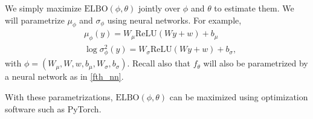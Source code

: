 \documentclass{scrartcl}
\begin{document}
We simply maximize $\text{ELBO}(\phi, \theta)$ jointly over $\phi$ and
$\theta$ to estimate them. We will parametrize $\mu_{\phi}$ and
$\sigma_{\phi}$ using neural networks. For example,
\begin{align*}
  &  \mu_{\phi}(y) = W_{\mu} \text{ReLU}(Wy + w) + b_{\mu}  \\
  & \log \sigma^2_{\phi}(y) = W_{\sigma} \text{ReLU}(Wy + w) + b_{\sigma},
\end{align*}
with $\phi = (W_{\mu}, W, w, b_{\mu}, W_{\sigma}, b_{\sigma})$. Recall
also that $f_{\theta}$ will also be parametrized by a neural network
as in \eqref{fth_nn}.

With these parametrizations, $\text{ELBO}(\phi, \theta)$ can be
maximized using optimization software such as PyTorch. 









\end{document}
